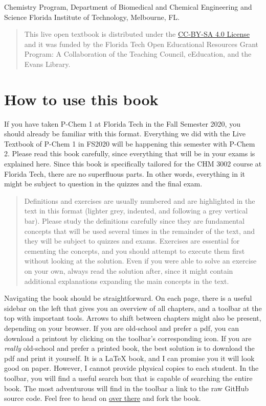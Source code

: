 \documentclass[
  9pt,
]{extbook}
\theoremstyle{definition}
\theoremstyle{definition}
\theoremstyle{definition}
\theoremstyle{remark}
\begin{document}
Chemistry Program, Department of Biomedical and Chemical Engineering and Science
Florida Institute of Technology, Melbourne, FL.

\begin{quote}
This live open textbook is distributed under the \href{https://creativecommons.org/licenses/by-sa/4.0/}{CC-BY-SA 4.0 License} and it was funded by the Florida Tech Open Educational Resources Grant Program: A Collaboration of the Teaching Council, eEducation, and the Evans Library.
\end{quote}

\hypertarget{how-to-use-this-book}{%
\section*{How to use this book}\label{how-to-use-this-book}}

If you have taken P-Chem 1 at Florida Tech in the Fall Semester 2020, you should already be familiar with this format. Everything we did with the Live Textbook of P-Chem 1 in FS2020 will be happening this semester with P-Chem 2. Please read this book carefully, since everything that will be in your exams is explained here.
Since this book is specifically tailored for the CHM 3002 course at Florida Tech, there are no superfluous parts. In other words, everything in it might be subject to question in the quizzes and the final exam.

\begin{quote}
Definitions and exercises are usually numbered and are highlighted in the text in this format (lighter grey, indented, and following a grey vertical bar). Please study the definitions carefully since they are fundamental concepts that will be used several times in the remainder of the text, and they will be subject to quizzes and exams. Exercises are essential for cementing the concepts, and you should attempt to execute them first without looking at the solution. Even if you were able to solve an exercise on your own, always read the solution after, since it might contain additional explanations expanding the main concepts in the text.
\end{quote}

Navigating the book should be straightforward. On each page, there is a useful sidebar on the left that gives you an overview of all chapters, and a toolbar at the top with important tools. Arrows to shift between chapters might also be present, depending on your browser. If you are old-school and prefer a pdf, you can download a printout by clicking on the toolbar's corresponding icon. If you are \emph{really} old-school and prefer a printed book, the best solution is to download the pdf and print it yourself. It is a LaTeX book, and I can promise you it will look good on paper. However, I cannot provide physical copies to each student. In the toolbar, you will find a useful search box that is capable of searching the entire book. The most adventurous will find in the toolbar a link to the raw GitHub source code. Feel free to head on \href{https://github.com/peverati/PChem2}{over there} and fork the book.
\end{document}
